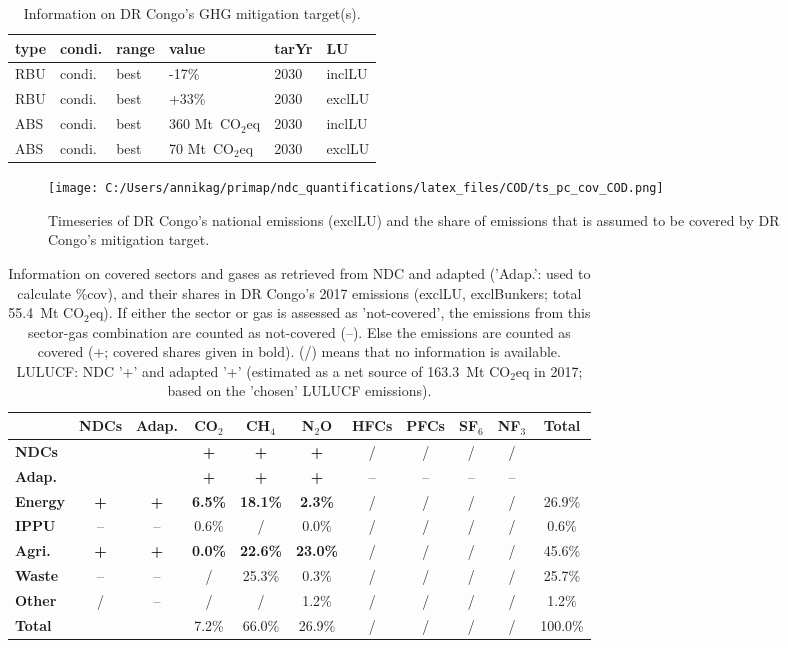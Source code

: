 \documentclass[12pt]{article}
\begin{document}
 \begin{table}[H]
 \centering
 \caption{Information on DR Congo's GHG mitigation target(s).}
 \label{tab:mitiTars}
 \begin{tabular}{l l l l l l }
 \bfseries type & \bfseries condi. & \bfseries range & \bfseries value & \bfseries tarYr & \bfseries LU \tabularnewline \hline
 RBU & condi. & best & -17\% & 2030 & inclLU \tabularnewline 
 RBU & condi. & best & +33\% & 2030 & exclLU \tabularnewline 
 ABS & condi. & best & 360 Mt~CO$_2$eq & 2030 & inclLU \tabularnewline 
 ABS & condi. & best & 70 Mt~CO$_2$eq & 2030 & exclLU \tabularnewline 
 \end{tabular}
 \end{table}

 \begin{figure}[H]
 \centering
 \texttt{[image: C:/Users/annikag/primap/ndc\_quantifications/latex\_files/COD/ts\_pc\_cov\_COD.png]}
 \caption{Timeseries of DR Congo's national emissions (exclLU) and the share of emissions that is assumed to be covered by DR Congo's mitigation target.}
 \label{fig:tsPcCov}
 \end{figure}

 \begin{table}[H]\small
 \centering
 \caption{Information on covered sectors and gases as retrieved from NDC and adapted ('Adap.': used to calculate \%cov), and their shares in DR Congo's 2017 emissions (exclLU, exclBunkers; total 55.4~Mt CO$_2$eq).
 If either the sector or gas is assessed as 'not-covered', the emissions from this sector-gas combination are counted as not-covered (--). 
 Else the emissions are counted as covered (+; covered shares given in bold).
 (/) means that no information is available.
 LULUCF: NDC '+' and adapted '+' (estimated as a net source of 163.3~Mt CO$_2$eq in 2017; based on the 'chosen' LULUCF emissions).}
 \label{tab:coveredSectorsGases}
 \begin{tabular}{l || c c || c c c c c c c | c}
 \bfseries  & \bfseries NDCs & \bfseries Adap. & \bfseries CO$_2$ & \bfseries CH$_4$ & \bfseries N$_2$O & \bfseries HFCs & \bfseries PFCs & \bfseries SF$_6$ & \bfseries NF$_3$ & \bfseries Total \tabularnewline \hline \hline
 \bfseries NDCs &  &  & \bfseries + & \bfseries + & \bfseries + & / & / & / & / &  \tabularnewline 
 \bfseries Adap. &  &  & \bfseries + & \bfseries + & \bfseries + & -- & -- & -- & -- &  \tabularnewline \hline \hline
 \bfseries Energy & \bfseries + & \bfseries + & \bfseries 6.5\% & \bfseries 18.1\% & \bfseries 2.3\% & / & / & / & / & 26.9\% \tabularnewline 
 \bfseries IPPU & -- & -- & 0.6\% & / & 0.0\% & / & / & / & / & 0.6\% \tabularnewline 
 \bfseries Agri. & \bfseries + & \bfseries + & \bfseries 0.0\% & \bfseries 22.6\% & \bfseries 23.0\% & / & / & / & / & 45.6\% \tabularnewline 
 \bfseries Waste & -- & -- & / & 25.3\% & 0.3\% & / & / & / & / & 25.7\% \tabularnewline 
 \bfseries Other & / & -- & / & / & 1.2\% & / & / & / & / & 1.2\% \tabularnewline \hline
 \bfseries Total &  &  & 7.2\% & 66.0\% & 26.9\% & / & / & / & / & 100.0\% \tabularnewline 
 \end{tabular}
 \end{table}
\end{document}
